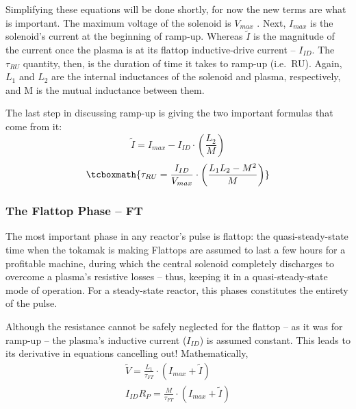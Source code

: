 Simplifying these equations will be done shortly, for now the new terms are what is important. The maximum voltage of the solenoid is $V_{max}$ . Next, $I_{max}$ is the solenoid's current at the beginning of ramp-up. Whereas $\tilde I$ is the magnitude of the current once the plasma is at its flattop inductive-drive current -- $I_{ID}$. The $\tau_{RU}$ quantity, then, is the duration of time it takes to ramp-up (i.e.\ RU). Again, $L_1$ and $L_2$ are the  internal inductances of the solenoid and plasma, respectively, and M is the mutual inductance between them.

The last step in discussing ramp-up is giving the two important formulas that come from it:
\begin{equation}
	\label{eq:itilde}
	\tilde I = I_{max} - I_{ID} \cdot \left( \frac{L_2}{M} \right)
\end{equation}
\begin{equation}
	\label{eq:tauru}
	\tcboxmath{
	\tau_{RU} = \frac{I_{ID}}{V_{max}} \cdot \left( \frac{ L_1 L_2 - M^2 }{ M } \right)
	}
\end{equation}

\subsubsection{The Flattop Phase -- FT}

The most important phase in any reactor's pulse is flattop: the quasi-steady-state time when the tokamak is making  Flattops are assumed to last a few hours for a profitable machine, during which the central solenoid completely discharges to overcome a plasma's resistive losses -- thus, keeping it in a quasi-steady-state mode of operation. For a steady-state reactor, this phases constitutes the entirety of the pulse.

Although the resistance cannot be safely neglected for the flattop -- as it was for ramp-up -- the plasma's inductive current ($I_{ID}$) is assumed constant. This leads to its derivative in equations cancelling out! Mathematically,
\begin{align}
	\tilde V = \frac{L_1}{\tau_{FT}} \cdot \left( I_{max} + \tilde I \right) \\
	I_{ID} R_P = \frac{M}{\tau_{FT}} \cdot \left( I_{max} + \tilde I \right)
\end{align}

